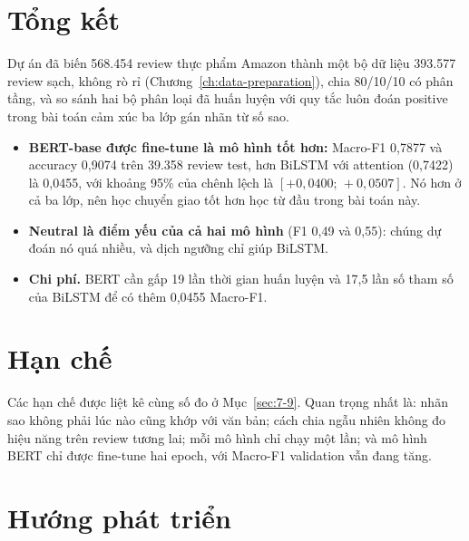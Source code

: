 \section{Tổng kết}
\label{sec:8-1}

Dự án đã biến 568.454 review thực phẩm Amazon thành một bộ dữ liệu 393.577 review sạch, không rò rỉ (Chương~\ref{ch:data-preparation}), chia 80/10/10 có phân tầng, và so sánh hai bộ phân loại đã huấn luyện với quy tắc luôn đoán positive trong bài toán cảm xúc ba lớp gán nhãn từ số sao.

\begin{itemize}
    \item \textbf{BERT-base được fine-tune là mô hình tốt hơn:} Macro-F1 0,7877 và accuracy 0,9074 trên 39.358 review test, hơn BiLSTM với attention (0,7422) là 0,0455, với khoảng 95\% của chênh lệch là $[+0{,}0400;\,+0{,}0507]$. Nó hơn ở cả ba lớp, nên học chuyển giao tốt hơn học từ đầu trong bài toán này.
    \item \textbf{Neutral là điểm yếu của cả hai mô hình} (F1 0,49 và 0,55): chúng dự đoán nó quá nhiều, và dịch ngưỡng chỉ giúp BiLSTM.
    \item \textbf{Chi phí.} BERT cần gấp 19 lần thời gian huấn luyện và 17,5 lần số tham số của BiLSTM để có thêm 0,0455 Macro-F1.
\end{itemize}

\section{Hạn chế}
\label{sec:8-2}

Các hạn chế được liệt kê cùng số đo ở Mục~\ref{sec:7-9}. Quan trọng nhất là: nhãn sao không phải lúc nào cũng khớp với văn bản; cách chia ngẫu nhiên không đo hiệu năng trên review tương lai; mỗi mô hình chỉ chạy một lần; và mô hình BERT chỉ được fine-tune hai epoch, với Macro-F1 validation vẫn đang tăng.

\section{Hướng phát triển}
\label{sec:8-3}

